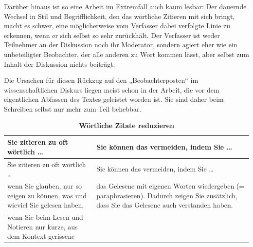\documentclass[]{book}
\theoremstyle{definition}
\theoremstyle{definition}
\theoremstyle{definition}
\theoremstyle{remark}
\begin{document}
Darüber hinaus ist so eine Arbeit im Extremfall auch kaum lesbar: Der
dauernde Wechsel in Stil und Begrifflichkeit, den das wörtliche Zitieren
mit sich bringt, macht es schwer, eine möglicherweise vom Verfasser
dabei verfolgte Linie zu erkennen, wenn er sich selbst so sehr
zurückhält. Der Verfasser ist weder Teilnehmer an der Diskussion noch
ihr Moderator, sondern agiert eher wie ein unbeteiligter Beobachter, der
alle anderen zu Wort kommen lässt, aber selbst zum Inhalt der Diskussion
nichts beiträgt.

Die Ursachen für diesen Rückzug auf den „Beobachterposten`` im
wissenschaftlichen Diskurs liegen meist schon in der Arbeit, die vor dem
eigentlichen Abfassen des Textes geleistet worden ist. Sie sind daher
beim Schreiben selbst nur mehr zum Teil behebbar.

\begin{longtable}[]{@{}ll@{}}
\caption{\textbf{\label{tab:paraphrasieren} Wörtliche Zitate
reduzieren}}\tabularnewline
\toprule
\begin{minipage}[b]{0.40\columnwidth}\raggedright\strut
Sie zitieren zu oft wörtlich \ldots{}\strut
\end{minipage} & \begin{minipage}[b]{0.54\columnwidth}\raggedright\strut
Sie können das vermeiden, indem Sie \ldots{}\strut
\end{minipage}\tabularnewline
\midrule
\endfirsthead
\toprule
\begin{minipage}[b]{0.40\columnwidth}\raggedright\strut
Sie zitieren zu oft wörtlich \ldots{}\strut
\end{minipage} & \begin{minipage}[b]{0.54\columnwidth}\raggedright\strut
Sie können das vermeiden, indem Sie \ldots{}\strut
\end{minipage}\tabularnewline
\midrule
\endhead
\begin{minipage}[t]{0.40\columnwidth}\raggedright\strut
wenn Sie glauben, nur so zeigen zu können, was und wieviel Sie gelesen
haben.\strut
\end{minipage} & \begin{minipage}[t]{0.54\columnwidth}\raggedright\strut
das Gelesene mit eigenen Worten wiedergeben (= paraphrasieren). Dadurch
zeigen Sie zusätzlich, dass Sie das Gelesene auch verstanden haben.
\vspace{-6mm}\strut
\end{minipage}\tabularnewline
\begin{minipage}[t]{0.40\columnwidth}\raggedright\strut
wenn Sie beim Lesen und Notieren nur kurze, aus dem Kontext gerissene

\end{minipage}
\end{longtable}
\end{document}
